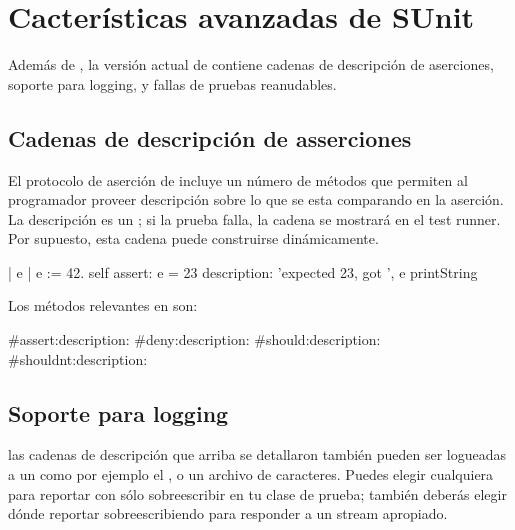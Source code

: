 \documentclass[a4paper,10pt,twoside]{book}
\begin{document}
\section{Cacter\'isticas avanzadas de SUnit}
Adem\'as de , la versi\'on actual de \sunit contiene cadenas de descripci\'on de aserciones,
soporte para logging, y fallas de pruebas reanudables.

\subsection{Cadenas de descripci\'on de asserciones}

El protocolo de aserci\'on de  incluye un n\'umero de m\'etodos que permiten
al programador proveer descripci\'on sobre lo que se esta comparando en la aserci\'on. La descripci\'on
es un ; si la prueba falla, la cadena se mostrar\'a en el test runner. Por supuesto, esta cadena
puede construirse din\'amicamente.

\begin{code}{}
| e |
e := 42.
self assert: e = 23
	description: 'expected 23, got ', e printString
\end{code}

Los  m\'etodos relevantes en  son:
\begin{code}{}
#assert:description:
#deny:description:
#should:description:
#shouldnt:description:
\end{code}

\subsection{Soporte para logging}
las cadenas de descripci\'on que arriba se detallaron tambi\'en pueden ser logueadas a un 
 como por ejemplo el , o un archivo de caracteres.
Puedes elegir cualquiera para reportar con s\'olo sobreescribir  en tu clase de prueba;
tambi\'en deber\'as elegir d\'onde reportar sobreescribiendo   para
responder a un stream apropiado.
\end{document}
